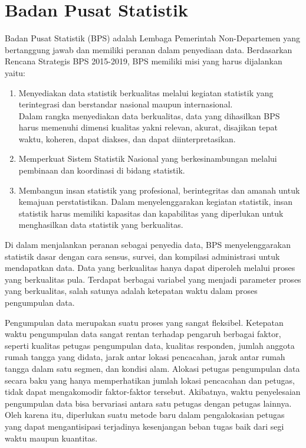 \section{Badan Pusat Statistik}
\label{sec:badan-pusat-statistik}
Badan Pusat Statistik (BPS) adalah Lembaga Pemerintah Non-Departemen yang bertanggung jawab dan memiliki peranan dalam penyediaan data. Berdasarkan Rencana Strategis BPS 2015-2019, BPS memiliki misi yang harus dijalankan yaitu:
\begin{enumerate}
\item Menyediakan data statistik berkualitas melalui kegiatan statistik yang terintegrasi dan berstandar nasional maupun internasional. \\
Dalam rangka menyediakan data berkualitas, data yang dihasilkan BPS harus memenuhi dimensi kualitas yakni relevan, akurat, disajikan tepat waktu, koheren, dapat diakses, dan dapat diinterpretasikan.
\item Memperkuat Sistem Statistik Nasional yang berkesinambungan melalui pembinaan dan koordinasi di bidang statistik.
\item Membangun insan statistik yang profesional, berintegritas dan amanah untuk kemajuan perstatistikan.
Dalam menyelenggarakan kegiatan statistik, insan statistik harus memiliki kapasitas dan kapabilitas yang diperlukan untuk menghasilkan data statistik yang berkualitas.
\end{enumerate}


Di dalam menjalankan peranan sebagai penyedia data, BPS menyelenggarakan statistik dasar dengan cara sensus, survei, dan kompilasi administrasi untuk mendapatkan data. Data yang berkualitas hanya dapat diperoleh melalui proses yang berkualitas pula. Terdapat berbagai variabel yang menjadi parameter proses yang berkualitas, salah satunya adalah ketepatan waktu dalam proses pengumpulan data.

Pengumpulan data merupakan suatu proses yang sangat fleksibel. Ketepatan waktu pengumpulan data sangat rentan terhadap pengaruh berbagai faktor, seperti kualitas petugas pengumpulan data, kualitas responden, jumlah anggota rumah tangga yang didata, jarak antar lokasi pencacahan, jarak antar rumah tangga dalam satu segmen, dan kondisi alam. Alokasi petugas pengumpulan data secara baku yang hanya memperhatikan jumlah lokasi pencacahan dan petugas, tidak dapat mengakomodir faktor-faktor tersebut. Akibatnya, waktu penyelesaian pengumpulan data bisa bervariasi antara satu petugas dengan petugas lainnya. Oleh karena itu, diperlukan suatu metode baru dalam pengalokasian petugas yang dapat mengantisipasi terjadinya kesenjangan beban tugas baik dari segi waktu maupun kuantitas.  


